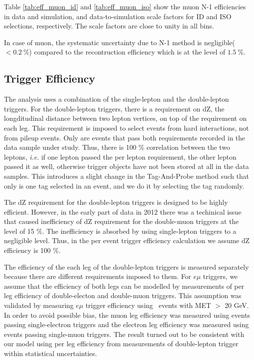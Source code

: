 Table \ref{tab:eff_muon_id} and \ref{tab:eff_muon_iso} show the muon N-1 efficiencies in 
data and simulation, and data-to-simulation scale factors for ID and ISO selections, respectively. 
The scale factors are close to unity in all bins. 

In case of muon, the systematic uncertainty due to N-1 method is negligible($<0.2~\%$)
compared to the recontruction efficiency which is at the level of $1.5~\%$. 

\subsection{Trigger Efficiency}
\label{subsec:trg_eff}

The analysis uses a combination of the single-lepton and the double-lepton triggers.
For the double-lepton triggers, there is a requirement on dZ, the longditudinal distance 
between two lepton vertices, on top of the requirement on each leg. 
This requirement is imposed to select events from hard interactions, not 
from pileup events.
Only are events that pass both requirements recorded in the data sample under study. 
Thus, there is 100 \% correlation between the two leptons, \textit{i.e.} 
if one lepton passed the per lepton requirement, the other lepton passed it as well, 
otherwise trigger objects have not been stored at all in the data samples.  
This introduces a slight change in the Tag-And-Probe method such that only is one 
tag selected in an event, and we do it by selecting the tag randomly.

The dZ requirement for the double-lepton triggers is designed to be highly efficient. 
However, in the early part of data in 2012 there was a techinical issue that 
caused inefficiency of dZ requirement for the double-muon triggers at the level of 15 \%.   
The inefficiency is absorbed by using single-lepton triggers to a negligible level. 
Thus, in the per event trigger efficiency calculation we assume dZ efficiency is 100 \%.

The efficiency of the each leg of the double-lepton triggers is measured separately 
because there are different requirements imposed to them. For $e\mu$ triggers, 
we assume that the efficiency of both legs can be modelled by measurements 
of per leg efficiency of double-electon and double-muon triggers.%
This assumption was validated by measuring $e\mu$ trigger efficiency 
using \Top\Atop~events with MET $>$ 20 GeV. In order to avoid possible bias,
the muon leg efficiency was measured using events passing single-electron triggers
and the electron leg efficiency was measured using events passing single-muon triggers.
The result turned out to be consistent with our model using per leg efficiency
from measurements of double-lepton trigger within statistical uncertainties. 

